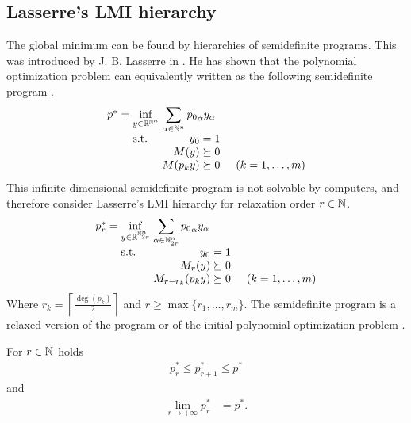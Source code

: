 
\subsection{Lasserre's LMI hierarchy}
The global minimum can be found by hierarchies of semidefinite programs. This was introduced by J. B. Lasserre in \cite{Lasserre}. He has shown that the polynomial optimization problem  can equivalently written as the following semidefinite program .
\begin{align}
  \arraycolsep=1.4pt
  \begin{array}{rclrcl@{\hskip0.5cm}l}
    p^* &=& \displaystyle \inf_{y\in\R^{\N^n}} & \multicolumn{3}{l}{\displaystyle \sum_{\alpha\in\N^n}{p_0}_\alpha y_\alpha} \\
    && \text{s.t.} & y_0 &=& 1\\
    &&& M(y) &\succeq& 0\\
    &&& M(p_ky) &\succeq& 0 & (k = 1,\ldots,m)
  \end{array}\labeleq{POP:opt:SDP}
\end{align}
This infinite-dimensional semidefinite program is not solvable by computers, and therefore consider Lasserre's LMI hierarchy  for relaxation order $r\in\mathbb{N}$.
\begin{align}
  \arraycolsep=1.4pt
  \begin{array}{rclrcl@{\hskip0.5cm}l}
    p_r^* &=& \displaystyle \inf_{y\in\R^{\N^n_{2r}}} & \multicolumn{2}{l}{\displaystyle \sum_{\alpha\in\N^n_{2r}}{p_0}_\alpha y_\alpha} \\
    && \text{s.t.} & y_0 &=& 1\\
    &&& M_r(y) &\succeq& 0\\
    &&& M_{r-r_k}(p_ky) &\succeq& 0 & (k = 1,\ldots,m)
  \end{array}\labeleq{POP:opt:SDPr}
\end{align}
Where $r_k = \left\lceil\frac{\deg(p_k)}{2}\right\rceil$ and $r\geq\max\{r_1, \ldots, r_m\}$.
The semidefinite program  is a relaxed version of the program  or of the initial polynomial optimization problem .

\begin{theorem}
  For $r\in\mathbb{N}$ holds
  \begin{align}
    p^*_r \leq p^*_{r+1} \leq p^*
  \end{align}
  and
  \begin{align}
    \lim_{r\rightarrow+\infty}p^*_r &= p^*.
  \end{align}
\end{theorem}

